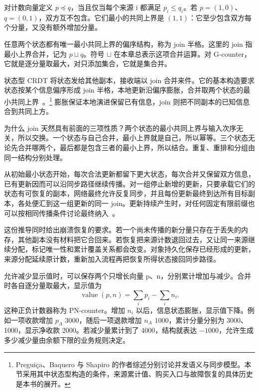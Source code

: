 对计数向量定义 $p\preceq q$，当且仅当每个来源 i 都满足 $p_i\le q_i$。若 $p=(1,0)$、$q=(0,1)$，双方互不包含。它们最小的共同上界是 $(1,1)$：它至少包含双方每个分量，又没有额外增加分量。

任意两个状态都有唯一最小共同上界的偏序结构，称为 join 半格。这里的 join 指最小上界合并，记为 $p\sqcup q$。符号 $\sqcup$ 在本章总表示这项合并运算。对 G-counter，它就是逐分量取最大，对只添加集合，它就是集合并。

状态型 CRDT 将状态发给其他副本，接收端以 join 合并来件。它的基本构造要求状态按某个信息偏序形成 join 半格，本地更新沿偏序膨胀，合并取两个状态的最小共同上界~\cite{preguica2018crdt}。\footnote{Preguiça、Baquero 与 Shapiro 的作者综述分别讨论并发语义与同步模型。本节采用其中状态型构造的条件，来源累计值、购买入口与故障恢复的具体历史是本书的展开。}
膨胀保证本地演进保留已有信息，join 则把不同副本的已知信息合到共同上方。

为什么 join 天然具有前面的三项性质？两个状态的最小共同上界与输入次序无关，所以交换。一个状态与自己合并，最小上界就是自己，所以幂等。三个状态无论先合并哪两个，最后都是包含三者的最小上界，所以结合。重复、重排和分组由同一结构分别处理。

从初始最小状态开始，每次合法更新都留下更大状态，每次合并又保留双方信息，已有更新因而可以沿同步路径继续传播。对一组停止新增的更新，只要承载它们的状态有可恢复的副本，网络最终允许反复同步，并且每份更新最终到达所有目标副本，各处便汇到这一组更新的同一 join。更新持续产生时，对任何固定有限前缀也可以按相同传播条件讨论最终纳入~\cite{preguica2018crdt}。


这份推导同时给出崩溃恢复的要求。若一个尚未传播的新分量只存在于丢失的内存，其他副本没有材料把它合回来。若恢复把来源计数退回过去，又让同一来源继续分配，标记唯一性和累计覆盖关系都会改变。对象持久化保存已经形成的更新，来源分配延续原计数，重新加入流程再把恢复所得状态接回同步路径。

允许减少显示值时，可以保存两个只增长向量 p、n，分别累计增加与减少。合并时各自逐分量取最大，显示值为
\[
  \operatorname{value}(p,n)=\sum_i p_i-\sum_i n_i.
\]
这种正负计数器称为 PN-counter。增加 $n_i$ 以后，信息状态膨胀，显示值下降。例如一项收款增加 $p_A$ 3000，随后一项退款增加 $n_A$ 1000，累计分量分别为 3000、1000，显示净收款 2000。若减少量累计到了 4000，结构就表达 $-1000$，允许生成多少减少量由余额下限的业务规则决定。


